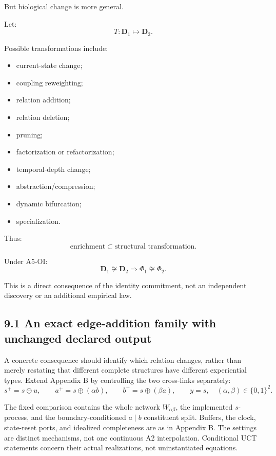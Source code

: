 \documentclass[
  11pt,
  a4paper,
]{article}
\providecommand{\tightlist}{%
  \setlength{\itemsep}{0pt}\setlength{\parskip}{0pt}}
\begin{document}
But biological change is more general.

Let:
\nopagebreak[4]
\[
T:
\mathbf D_1
\mapsto
\mathbf D_2.
\]

Possible transformations include:

\begin{itemize}
\tightlist
\item
  current-state change;
\item
  coupling reweighting;
\item
  relation addition;
\item
  relation deletion;
\item
  pruning;
\item
  factorization or refactorization;
\item
  temporal-depth change;
\item
  abstraction/compression;
\item
  dynamic bifurcation;
\item
  specialization.
\end{itemize}

Thus:
\nopagebreak[4]
\[
\boxed{
\text{enrichment}
\subset
\text{structural transformation}.
}
\]

Under A5-OI:
\nopagebreak[4]
\[
\mathbf D_1\not\cong\mathbf D_2
\Rightarrow
\Phi_1\not\cong\Phi_2.
\]

This is a direct consequence of the identity commitment, not an
independent discovery or an additional empirical law.

\hypertarget{an-exact-edge-addition-family-with-unchanged-declared-output}{%
\subsection{9.1 An exact edge-addition family with unchanged declared
output}\label{an-exact-edge-addition-family-with-unchanged-declared-output}}

A concrete consequence should identify which relation changes, rather
than merely restating that different complete structures have different
experiential types. Extend Appendix B by controlling the two cross-links
separately:
\nopagebreak[4]
\[
s^+=s\oplus u,\qquad
a^+=s\oplus(\alpha b),\qquad
b^+=s\oplus(\beta a),\qquad y=s,
\quad (\alpha,\beta)\in\{0,1\}^2.
\]

The fixed comparison contains the whole network \(W_{\alpha\beta}\), the
implemented \(s\)-process, and the boundary-conditioned \(a\mid b\)
constituent split. Buffers, the clock, state-reset ports, and idealized
completeness are as in Appendix B. The settings are distinct mechanisms,
not one continuous A2 interpolation. Conditional UCT statements concern
their actual realizations, not uninstantiated equations.
\end{document}
